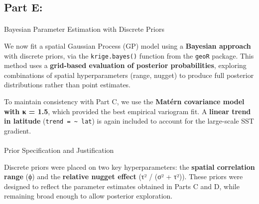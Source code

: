 \documentclass[
  11pt,
]{article}
\makeatletter
\let\oldparagraph\paragraph
\renewcommand{\paragraph}{
    \@ifstar
      \xxxParagraphStar
      \xxxParagraphNoStar
  }
\newcommand{\xxxParagraphStar}[1]{\oldparagraph*{#1}\mbox{}}
\newcommand{\xxxParagraphNoStar}[1]{\oldparagraph{#1}\mbox{}}
\makeatother
\begin{document}
\subsection{Part E:}\label{part-e}

\paragraph{Bayesian Parameter Estimation with Discrete
Priors}\label{bayesian-parameter-estimation-with-discrete-priors}

We now fit a spatial Gaussian Process (GP) model using a
\textbf{Bayesian approach} with discrete priors, via the
\texttt{krige.bayes()} function from the \texttt{geoR} package. This
method uses a \textbf{grid-based evaluation of posterior probabilities},
exploring combinations of spatial hyperparameters (range, nugget) to
produce full posterior distributions rather than point estimates.

To maintain consistency with Part C, we use the \textbf{Matérn
covariance model with κ = 1.5}, which provided the best empirical
variogram fit. A \textbf{linear trend in latitude}
(\texttt{trend\ =\ \textasciitilde{}\ lat}) is again included to account
for the large-scale SST gradient.

\paragraph{Prior Specification and
Justification}\label{prior-specification-and-justification}

Discrete priors were placed on two key hyperparameters: the
\textbf{spatial correlation range} (ϕ) and the \textbf{relative nugget
effect} (τ² / (σ² + τ²)). These priors were designed to reflect the
parameter estimates obtained in Parts C and D, while remaining broad
enough to allow posterior exploration.
\end{document}
